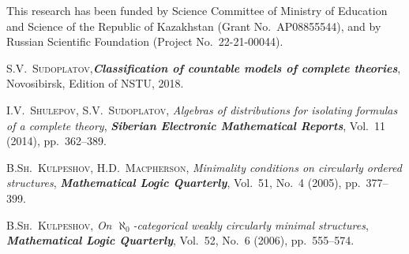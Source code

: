 \documentclass[bsl,meeting]{asl}
\begin{document}
This research has been funded by Science Committee of Ministry of
Education and Science of the Republic of Kazakhstan (Grant
No.~AP08855544), and by Russian Scientific Foundation (Project
No.~22-21-00044).

\begin{thebibliography}{10}

{\scshape  S.V.~Sudoplatov},{\bfseries\itshape Classification of
countable models of complete theories}, Novosibirsk, Edition of
NSTU, 2018.

{\scshape  I.V.~Shulepov, S.V.~Sudoplatov}, {\itshape Algebras of
distributions for isolating formulas of a complete theory},
{\bfseries\itshape Siberian Electronic Mathematical Reports},
Vol.~11 (2014), pp.~362--389.

{\scshape  B.Sh.~Kulpeshov, H.D.~Macpherson}, {\itshape Minimality
conditions on circularly ordered struc\-tures}, {\bfseries\itshape
Mathematical Logic Quarterly}, Vol.~51, No.~4 (2005),
pp.~377--399.

{\scshape B.Sh.~Kulpeshov}, {\itshape On $\aleph_0$-categorical
weakly circularly minimal struc\-tures}, {\bfseries\itshape
Ma\-the\-ma\-ti\-cal Logic Quarterly}, Vol.~52, No.~6 (2006),
pp.~555--574.







\end{thebibliography}


\vspace*{-0.5\baselineskip}
\end{document}
